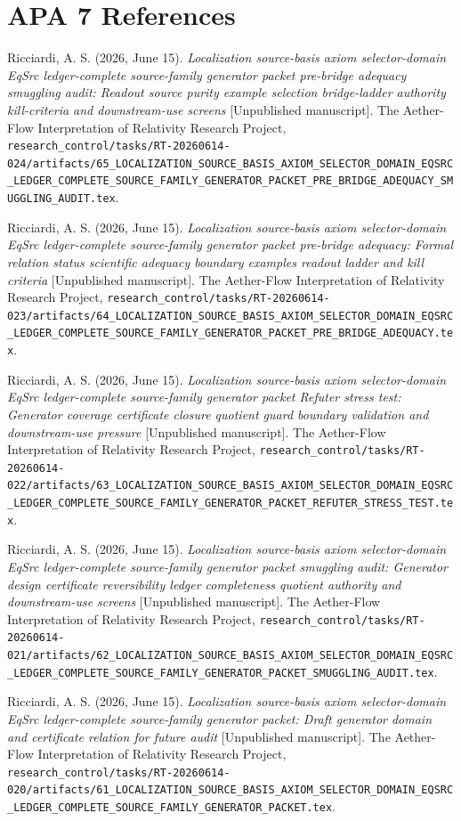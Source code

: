 \documentclass[11pt]{article}
\begin{document}
\section*{APA 7 References}

Ricciardi, A. S. (2026, June 15). \emph{Localization source-basis axiom
selector-domain EqSrc ledger-complete source-family generator packet
pre-bridge adequacy smuggling audit: Readout source purity example
selection bridge-ladder authority kill-criteria and downstream-use
screens} [Unpublished manuscript]. The Aether-Flow Interpretation of
Relativity Research Project,
\texttt{research\_control/tasks/RT-20260614-024/artifacts/65\_LOCALIZATION\_SOURCE\_BASIS\_AXIOM\_SELECTOR\_DOMAIN\_EQSRC\_LEDGER\_COMPLETE\_SOURCE\_FAMILY\_GENERATOR\_PACKET\_PRE\_BRIDGE\_ADEQUACY\_SMUGGLING\_AUDIT.tex}.

Ricciardi, A. S. (2026, June 15). \emph{Localization source-basis axiom
selector-domain EqSrc ledger-complete source-family generator packet
pre-bridge adequacy: Formal relation status scientific adequacy boundary
examples readout ladder and kill criteria} [Unpublished manuscript]. The
Aether-Flow Interpretation of Relativity Research Project,
\texttt{research\_control/tasks/RT-20260614-023/artifacts/64\_LOCALIZATION\_SOURCE\_BASIS\_AXIOM\_SELECTOR\_DOMAIN\_EQSRC\_LEDGER\_COMPLETE\_SOURCE\_FAMILY\_GENERATOR\_PACKET\_PRE\_BRIDGE\_ADEQUACY.tex}.

Ricciardi, A. S. (2026, June 15). \emph{Localization source-basis axiom
selector-domain EqSrc ledger-complete source-family generator packet
Refuter stress test: Generator coverage certificate closure quotient
guard boundary validation and downstream-use pressure} [Unpublished
manuscript]. The Aether-Flow Interpretation of Relativity Research
Project,
\texttt{research\_control/tasks/RT-20260614-022/artifacts/63\_LOCALIZATION\_SOURCE\_BASIS\_AXIOM\_SELECTOR\_DOMAIN\_EQSRC\_LEDGER\_COMPLETE\_SOURCE\_FAMILY\_GENERATOR\_PACKET\_REFUTER\_STRESS\_TEST.tex}.

Ricciardi, A. S. (2026, June 15). \emph{Localization source-basis axiom
selector-domain EqSrc ledger-complete source-family generator packet
smuggling audit: Generator design certificate reversibility ledger
completeness quotient authority and downstream-use screens}
[Unpublished manuscript]. The Aether-Flow Interpretation of Relativity
Research Project,
\texttt{research\_control/tasks/RT-20260614-021/artifacts/62\_LOCALIZATION\_SOURCE\_BASIS\_AXIOM\_SELECTOR\_DOMAIN\_EQSRC\_LEDGER\_COMPLETE\_SOURCE\_FAMILY\_GENERATOR\_PACKET\_SMUGGLING\_AUDIT.tex}.

Ricciardi, A. S. (2026, June 15). \emph{Localization source-basis axiom
selector-domain EqSrc ledger-complete source-family generator packet:
Draft generator domain and certificate relation for future audit}
[Unpublished manuscript]. The Aether-Flow Interpretation of Relativity
Research Project,
\texttt{research\_control/tasks/RT-20260614-020/artifacts/61\_LOCALIZATION\_SOURCE\_BASIS\_AXIOM\_SELECTOR\_DOMAIN\_EQSRC\_LEDGER\_COMPLETE\_SOURCE\_FAMILY\_GENERATOR\_PACKET.tex}.
\end{document}
